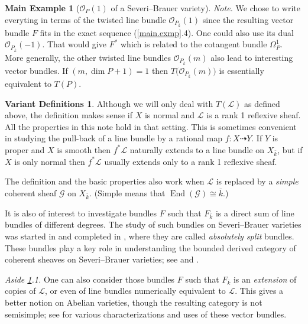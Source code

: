 \documentclass{amsart}
\theoremstyle{definition}
\newtheorem{vardefs}[thm]{Variant Definitions}
\newtheorem{main-exmp}[thm]{Main Example}
\theoremstyle{remark}
\renewcommand{\o}[0]{{\mathcal O}}
\newcommand{\map}[0]{\dasharrow}
\newcommand{\End}[0]{\operatorname{End}}
\begin{document}
\begin{main-exmp}[$\o_P(1)$ of a Severi--Brauer variety]
{\it Note.} We chose to write everyting in terms of the 
twisted line bundle $\o_{P_{\bar k}}(1)$ since  the resulting vector bundle $F$ fits in the exact sequence (\ref{main.exmp}.4).  One could also use its dual
$\o_{P_{\bar k}}(-1)$. That would give $F^*$ which is related to the cotangent bundle $\Omega_P^1$. More generally, the other twisted line bundles  $\o_{P_{\bar k}}(m)$ also lead to  interesting vector bundles. If $(m, \dim P+1)=1$ then
$T\bigl(\o_{P_{\bar k}}(m)\bigr)$ is essentially equivalent to
$T(P)$.
\end{main-exmp}


\begin{vardefs} \label{vardefs.1}
Although we will only deal with $T({\mathcal L})$ as defined above, 
the definition  makes sense if $X$ is normal and ${\mathcal L}$ is a
rank 1 reflexive sheaf. All the properties in this note hold in that setting. This is sometimes convenient in studying  the pull-back of a line bundle by a rational map $f:X\map Y$.   If $Y$ is proper and $X$ is smooth then $f^*{\mathcal L}$ naturally  extends to a line bundle on $X_{\bar k}$, but if
$X$ is only normal then $f^*{\mathcal L}$  usually extends only to a
rank 1 reflexive sheaf.



The definition and the basic properties also work when
${\mathcal L}$ is replaced by a  {\it simple} coherent sheaf ${\mathcal G}$ on $X_{\bar k}$.  (Simple means that  $\End({\mathcal G})\cong \bar k$.) 

It is also of interest to investigate   bundles $F$ such that
$F_{\bar k}$ is a direct sum of line bundles of different degrees. 
The study of such bundles on  Severi--Brauer varieties  was started in \cite{MR2391341, MR2507589} and completed in \cite{MR4796081}, where they are called {\it absolutely split} bundles. These bundles play a key role in understanding the bounded derived category of coherent sheaves on  Severi--Brauer varieties; see \cite{MR2863422} and \cite{2017arXiv170103020N}.

{\it Aside \ref{vardefs.1}.1.} One can also consider those bundles $F$ such that
$F_{\bar k}$ is an {\em extension} of copies of ${\mathcal L}$, or even of line bundles numerically equivalent to ${\mathcal L}$.  This gives a better notion on Abelian varieties, though the resulting category is not semisimple; 
see \cite{MR607081, MR2529476, MR3194649} for various characterizations and uses of these vector bundles.
\end{vardefs}
\end{document}
